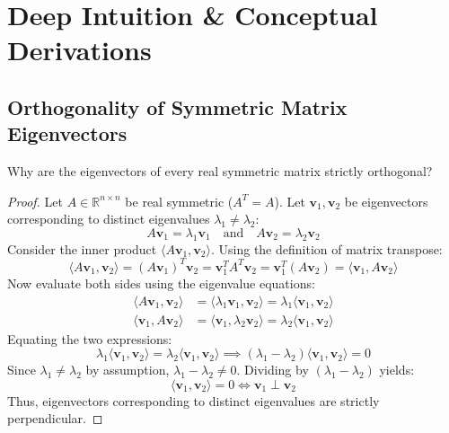 \section{Deep Intuition \& Conceptual Derivations}

\subsection{Orthogonality of Symmetric Matrix Eigenvectors}

Why are the eigenvectors of every real symmetric matrix strictly orthogonal?
\begin{proof}
Let $A \in \mathbb{R}^{n \times n}$ be real symmetric ($A^T = A$). Let $\mathbf{v}_1, \mathbf{v}_2$ be eigenvectors corresponding to distinct eigenvalues $\lambda_1 \neq \lambda_2$:
\begin{equation*}
A \mathbf{v}_1 = \lambda_1 \mathbf{v}_1 \quad \text{and} \quad A \mathbf{v}_2 = \lambda_2 \mathbf{v}_2
\end{equation*}
Consider the inner product $\langle A\mathbf{v}_1, \mathbf{v}_2 \rangle$. Using the definition of matrix transpose:
\begin{equation*}
\langle A\mathbf{v}_1, \mathbf{v}_2 \rangle = (A\mathbf{v}_1)^T \mathbf{v}_2 = \mathbf{v}_1^T A^T \mathbf{v}_2 = \mathbf{v}_1^T (A\mathbf{v}_2) = \langle \mathbf{v}_1, A\mathbf{v}_2 \rangle
\end{equation*}
Now evaluate both sides using the eigenvalue equations:
\begin{align*}
\langle A\mathbf{v}_1, \mathbf{v}_2 \rangle &= \langle \lambda_1 \mathbf{v}_1, \mathbf{v}_2 \rangle = \lambda_1 \langle \mathbf{v}_1, \mathbf{v}_2 \rangle \\
\langle \mathbf{v}_1, A\mathbf{v}_2 \rangle &= \langle \mathbf{v}_1, \lambda_2 \mathbf{v}_2 \rangle = \lambda_2 \langle \mathbf{v}_1, \mathbf{v}_2 \rangle
\end{align*}
Equating the two expressions:
\begin{equation}
\lambda_1 \langle \mathbf{v}_1, \mathbf{v}_2 \rangle = \lambda_2 \langle \mathbf{v}_1, \mathbf{v}_2 \rangle \implies (\lambda_1 - \lambda_2) \langle \mathbf{v}_1, \mathbf{v}_2 \rangle = 0
\end{equation}
Since $\lambda_1 \neq \lambda_2$ by assumption, $\lambda_1 - \lambda_2 \neq 0$. Dividing by $(\lambda_1 - \lambda_2)$ yields:
\begin{equation}
\langle \mathbf{v}_1, \mathbf{v}_2 \rangle = 0 \iff \mathbf{v}_1 \perp \mathbf{v}_2
\end{equation}
Thus, eigenvectors corresponding to distinct eigenvalues are strictly perpendicular.
\end{proof}

